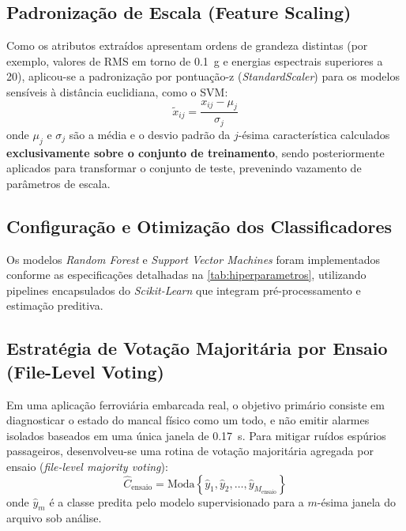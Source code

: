 \subsection{Padronização de Escala (Feature Scaling)}
Como os atributos extraídos apresentam ordens de grandeza distintas (por exemplo, valores de RMS em torno de \SI{0.1}{g} e energias espectrais superiores a \num{20}), aplicou-se a padronização por pontuação-z (\textit{StandardScaler}) para os modelos sensíveis à distância euclidiana, como o SVM:
\begin{equation}
    \tilde{x}_{ij} = \frac{x_{ij} - \mu_j}{\sigma_j}
    \label{eq:standard_scaler}
\end{equation}
onde $\mu_j$ e $\sigma_j$ são a média e o desvio padrão da $j$-ésima característica calculados \textbf{exclusivamente sobre o conjunto de treinamento}, sendo posteriormente aplicados para transformar o conjunto de teste, prevenindo vazamento de parâmetros de escala.

\subsection{Configuração e Otimização dos Classificadores}
Os modelos \textit{Random Forest} e \textit{Support Vector Machines} foram implementados conforme as especificações detalhadas na \autoref{tab:hiperparametros}, utilizando pipelines encapsulados do \textit{Scikit-Learn} que integram pré-processamento e estimação preditiva.



\subsection{Estratégia de Votação Majoritária por Ensaio (File-Level Voting)}
Em uma aplicação ferroviária embarcada real, o objetivo primário consiste em diagnosticar o estado do mancal físico como um todo, e não emitir alarmes isolados baseados em uma única janela de \SI{0,17}{\second}. Para mitigar ruídos espúrios passageiros, desenvolveu-se uma rotina de votação majoritária agregada por ensaio (\textit{file-level majority voting}):
\begin{equation}
    \hat{C}_{\text{ensaio}} = \text{Moda} \left\{ \hat{y}_1, \hat{y}_2, \dots, \hat{y}_{M_{\text{ensaio}}} \right\}
    \label{eq:file_voting}
\end{equation}
onde $\hat{y}_m$ é a classe predita pelo modelo supervisionado para a $m$-ésima janela do arquivo sob análise.
